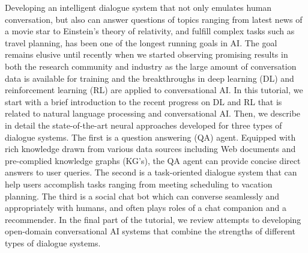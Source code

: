 Developing an intelligent dialogue system that not only emulates human conversation, but also can answer questions of topics ranging from latest news of a movie star to Einstein's theory of relativity, and fulfill complex tasks such as travel planning, has been one of the longest running goals in AI. The goal remains elusive until recently when we started observing promising results in both the research community and industry as the large amount of conversation data is available for training and the breakthroughs in deep learning (DL) and reinforcement learning (RL) are applied to conversational AI. In this tutorial, we start with a brief introduction to the recent progress on DL and RL that is related to natural language processing and conversational AI. Then, we describe in detail the state-of-the-art neural approaches developed for three types of dialogue systems. The first is a question answering (QA) agent. Equipped with rich knowledge drawn from various data sources including Web documents and pre-complied knowledge graphs (KG's), the QA agent can provide concise direct answers to user queries.  The second is a task-oriented dialogue system that can help users accomplish tasks ranging from meeting scheduling to vacation planning. The third is a social chat bot which can converse seamlessly and appropriately with humans, and often plays roles of a chat companion and a recommender. In the final part of the tutorial, we review attempts to developing open-domain conversational AI systems that combine the strengths of different types of dialogue systems.
